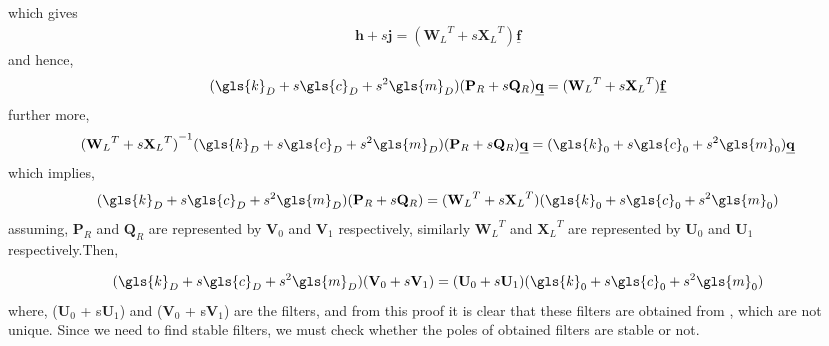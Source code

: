 which gives
\begin{align}
\mathbf{h} + s\mathbf{j} = ({\mathbf{W}_L}^T + s{\mathbf{X}_L}^T)\underline{\mathbf{f}}
\end{align}
and hence,
\begin{align}(\gls{k}_D + s\gls{c}_D + s^2\gls{m}_D) (\mathbf{P}_R + s\mathbf{Q}_R) \underline{\mathbf{q}} = ({\mathbf{W}_L}^T + s{\mathbf{X}_L}^T) \underline{\mathbf{f}}\end{align} 
further more, 
\begin{align}{({\mathbf{W}_L}^T + s{\mathbf{X}_L}^T)}^{-1}(\gls{k}_D + s\gls{c}_D + s^2\gls{m}_D) (\mathbf{P}_R + s\mathbf{Q}_R) \underline{\mathbf{q}} = (\gls{k}_0 + s\gls{c}_0 + s^2\gls{m}_0) \underline{\mathbf{q}}\end{align} 
which implies, 
\begin{align}(\gls{k}_D + s\gls{c}_D + s^2\gls{m}_D) (\mathbf{P}_R + s\mathbf{Q}_R) = ({\mathbf{W}_L}^T + s{\mathbf{X}_L}^T)(\gls{k}_0 + s\gls{c}_0 + s^2\gls{m}_0)\end{align}
assuming, $\mathbf{P}_R$ and $\mathbf{Q}_R$ are represented by $\mathbf{V}_0$ and $\mathbf{V}_1$ respectively, similarly ${\mathbf{W}_L}^T$ and ${\mathbf{X}_L}^T$ are represented by $\mathbf{U}_0$ and $\mathbf{U}_1$ respectively.Then,

\begin{align}(\gls{k}_D + s\gls{c}_D + s^2\gls{m}_D)(\mathbf{V}_0 + s\mathbf{V}_1) = (\mathbf{U}_0 + s\mathbf{U}_1)(\gls{k}_0 + s\gls{c}_0 + s^2\gls{m}_0)\end{align} 
where, ($\mathbf{U}_0$ + s$\mathbf{U}_1$) and ($\mathbf{V}_0$ + 
s$\mathbf{V}_1$) are the filters, and from this proof it is clear that 
these filters are obtained from , which are not 
unique. Since we need to find stable filters, we must check whether the 
poles of obtained filters are stable or not.

